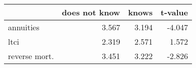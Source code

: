 \begin{tabular}{lrrr}
\toprule
{} &  does not know &  knows &  t-value \\
\midrule
annuities     &          3.567 &  3.194 &   -4.047 \\
ltci          &          2.319 &  2.571 &    1.572 \\
reverse mort. &          3.451 &  3.222 &   -2.826 \\
\bottomrule
\end{tabular}
